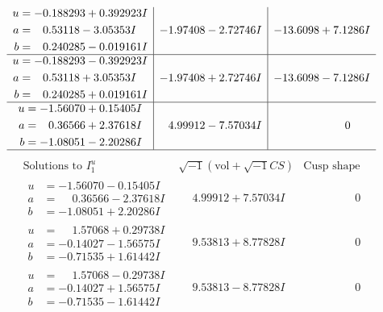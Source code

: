 \documentclass[1p]{elsarticle_modified}
\theoremstyle{definition}
\newcommand{\I}{\sqrt{-1}}
\begin{document}
$$\begin{array}{c|c|c}
\begin{aligned}
u &= -0.188293 + 0.392923 I \\
a &= \phantom{-}0.53118 - 3.05353 I \\
b &= \phantom{-}0.240285 - 0.019161 I\end{aligned}
 & -1.97408 - 2.72746 I & -13.6098 + 7.1286 I \\ \hline\begin{aligned}
u &= -0.188293 - 0.392923 I \\
a &= \phantom{-}0.53118 + 3.05353 I \\
b &= \phantom{-}0.240285 + 0.019161 I\end{aligned}
 & -1.97408 + 2.72746 I & -13.6098 - 7.1286 I \\ \hline\begin{aligned}
u &= -1.56070 + 0.15405 I \\
a &= \phantom{-}0.36566 + 2.37618 I \\
b &= -1.08051 - 2.20286 I\end{aligned}
 & \phantom{-}4.99912 - 7.57034 I & \phantom{-0.000000 } 0\\
 \hline 
 \end{array}$$\newpage$$\begin{array}{c|c|c}  
\text{Solutions to }I^u_{1}& \I (\text{vol} + \sqrt{-1}CS) & \text{Cusp shape}\\
 \hline 
\begin{aligned}
u &= -1.56070 - 0.15405 I \\
a &= \phantom{-}0.36566 - 2.37618 I \\
b &= -1.08051 + 2.20286 I\end{aligned}
 & \phantom{-}4.99912 + 7.57034 I & \phantom{-0.000000 } 0 \\ \hline\begin{aligned}
u &= \phantom{-}1.57068 + 0.29738 I \\
a &= -0.14027 - 1.56575 I \\
b &= -0.71535 + 1.61442 I\end{aligned}
 & \phantom{-}9.53813 + 8.77828 I & \phantom{-0.000000 } 0 \\ \hline\begin{aligned}
u &= \phantom{-}1.57068 - 0.29738 I \\
a &= -0.14027 + 1.56575 I \\
b &= -0.71535 - 1.61442 I\end{aligned}
 & \phantom{-}9.53813 - 8.77828 I & \phantom{-0.000000 } 0 \\ \hline\begin{aligned}

\end{aligned}
\end{array}$$
\end{document}
